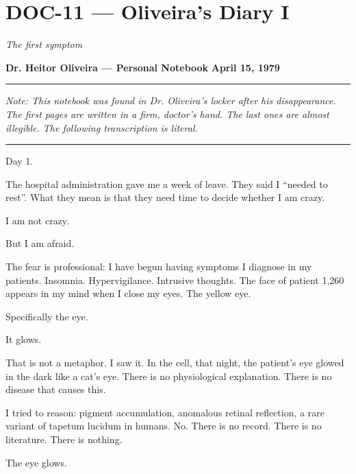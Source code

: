 \section*{\textbf{DOC-11} --- Oliveira's Diary I}

\noindent \textit{The first symptom}

\noindent \textbf{Dr. Heitor Oliveira --- Personal Notebook}
\textbf{April 15, 1979}

\vspace{0.5em}\noindent\rule{\textwidth}{0.5pt}\vspace{0.5em}

\noindent \textit{Note: This notebook was found in Dr. Oliveira's locker after his disappearance. The first pages are written in a firm, doctor's hand. The last ones are almost illegible. The following transcription is literal.}

\vspace{0.5em}\noindent\rule{\textwidth}{0.5pt}\vspace{0.5em}

\noindent Day 1.

\noindent The hospital administration gave me a week of leave. They said I \textquotedblleft{}needed to rest\textquotedblright{}. What they mean is that they need time to decide whether I am crazy.

\noindent I am not crazy.

\noindent But I am afraid.

\noindent The fear is professional: I have begun having symptoms I diagnose in my patients. Insomnia. Hypervigilance. Intrusive thoughts. The face of patient 1,260 appears in my mind when I close my eyes. The yellow eye.

\noindent Specifically the eye.

\noindent It glows.

\noindent That is not a metaphor. I saw it. In the cell, that night, the patient's eye glowed in the dark like a cat's eye. There is no physiological explanation. There is no disease that causes this.

\noindent I tried to reason: pigment accumulation, anomalous retinal reflection, a rare variant of tapetum lucidum in humans. No. There is no record. There is no literature. There is nothing.

\noindent The eye glows.

